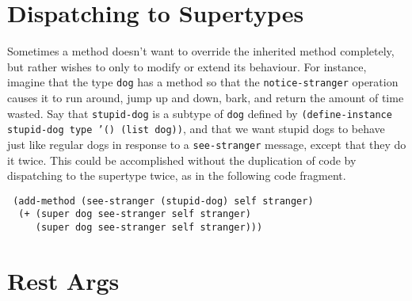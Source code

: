 


\section{Dispatching to Supertypes}

Sometimes a method doesn't want to override the inherited method
completely, but rather wishes to only to modify or extend its
behaviour.  For instance, imagine that the type \texttt{dog} has a method
so that the \texttt{notice-stranger} operation causes it to run around,
jump up and down, bark, and return the amount of time wasted.  Say
that \texttt{stupid-dog} is a subtype of \texttt{dog} defined by
\texttt{(define-instance stupid-dog type '() (list dog))}, and that we
want stupid dogs to behave just like regular dogs in response to a
\texttt{see-stranger} message, except that they do it twice.  This could
be accomplished without the duplication of code by dispatching to the
supertype twice, as in the following code fragment.
\begin{flushleft}\tt
(add-method (see-stranger (stupid-dog) self stranger)\\
~~(+ ({\upar}super dog see-stranger self stranger)\\
~~~~~({\upar}super dog see-stranger self stranger)))
\end{flushleft}





\section{Rest Args}

